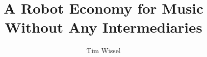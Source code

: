 \documentclass[whitelogo]{tudelft-report}
\begin{document}
\frontmatter


\title[tudelft-white]{A Robot Economy for Music Without Any Intermediaries}
\author[tudelft-white]{Tim Wissel}
\makecover[split]






\tableofcontents

\mainmatter










\appendix

%


\end{document}
